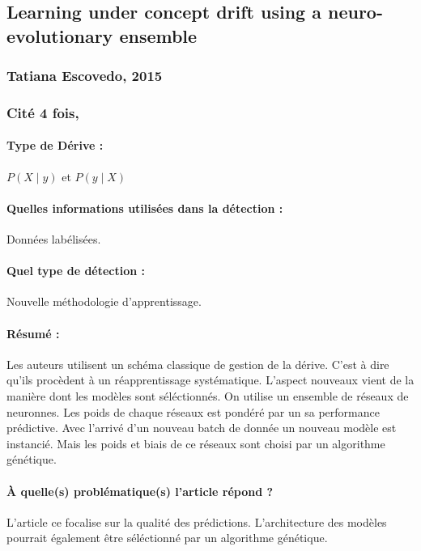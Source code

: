 \documentclass[11pt,a4paper]{report}
\begin{document}
\subsection{Learning under concept drift using a neuro-evolutionary ensemble}
\subsubsection{Tatiana Escovedo, 2015}

\subsubsection{Cité 4 fois, }

\paragraph{Type de Dérive :} $P(X\mid y)$ et $P(y \mid X)$ 
\paragraph{Quelles informations utilisées dans la détection :} Données labélisées.
\paragraph{Quel type de détection :} Nouvelle méthodologie d'apprentissage.

\paragraph{Résumé :} Les auteurs utilisent un schéma classique de gestion de la dérive. C'est à dire qu'ils procèdent à un réapprentissage systématique. L'aspect nouveaux vient de la manière dont les modèles sont séléctionnés. On utilise un ensemble de réseaux de neuronnes. Les poids de chaque réseaux est pondéré par un sa performance prédictive. Avec l'arrivé d'un nouveau batch de donnée un nouveau modèle est instancié. Mais les poids et biais de ce réseaux sont choisi par un algorithme génétique.

\paragraph{À quelle(s) problématique(s) l'article répond ?} L'article ce focalise sur la qualité des prédictions. L'architecture des modèles pourrait également être séléctionné par un algorithme génétique.
\end{document}
